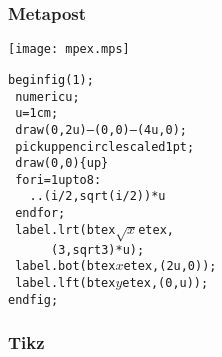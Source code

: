\documentclass[nodefaultblocks]{beamer}
\begin{document}
\begin{frame}\frametitle{Metapost}
  \begin{minipage}{0.3\linewidth}
  \texttt{[image: mpex.mps]}
  \end{minipage}
  \hfill
  \begin{minipage}{0.6\linewidth}
    \small
    \begin{alltt}
beginfig(1);\\
\hspace*{0pt}~ numeric u;\\
\hspace*{0pt}~ u = 1cm;\\
\hspace*{0pt}~ draw (0,2u)---(0,0)---(4u,0);\\
\hspace*{0pt}~ pickup pencircle scaled 1pt;\\
\hspace*{0pt}~ draw (0,0)\{up\}\\
\hspace*{0pt}~ for i=1 upto 8: \\
\hspace*{0pt}~~~  ..(i/2,sqrt(i/2))*u  \\
\hspace*{0pt}~ endfor;\\
\hspace*{0pt}~ label.lrt(btex $\sqrt x$ etex, 
\hspace*{0pt}~ ~ ~ ~ ~ ~ (3,sqrt 3)*u);\\
\hspace*{0pt}~ label.bot(btex $x$ etex, (2u,0));\\
\hspace*{0pt}~ label.lft(btex $y$ etex, (0,u));\\
endfig;\\
    \end{alltt}
  \end{minipage}
\end{frame}

\begin{frame}\frametitle{Tikz}
%
%
%
%
%
\end{frame}
\end{document}
